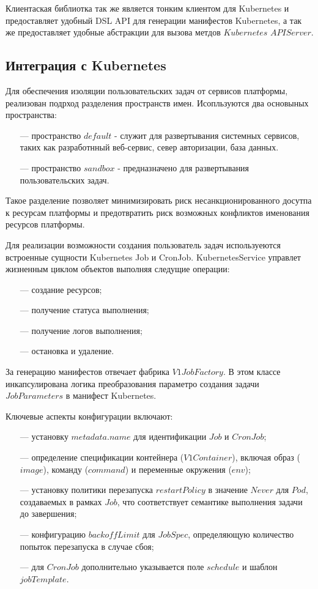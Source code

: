 Клиентаская библиотка так же является тонким клиентом для Kubernetes и предоставляет удобный DSL API для генерации манифестов Kubernetes\cite{poulton2023kubernetes}, а так же предоставляет удобные абстракции для вызова метдов $Kubernetes$ $API Server$.

\subsection{Интеграция с Kubernetes}

Для обеспечения изоляции пользовательских задач от сервисов платформы, реализован подрход разделения пространств имен.
Исопльзуются два основыных пространства:

\begin{itemize}
\item[---] пространство $default$ - служит для развертывания системных сервисов, таких как разработнный веб-сервис, север авторизации, база данных.
\item[---] пространство $sandbox$ - предназначено для развертывания пользовательских задач. 
\end{itemize}

Такое разделение позволяет минимизировать риск несанкционированного досутпа к ресурсам платформы и предотвратить риск возможных конфликтов именования ресурсов платформы.

Для реализации возможности создания пользователь задач используеются встроенные сущности Kubernetes Job и CronJob.
KubernetesService управлет жизненным циклом объектов выполняя следущие операции:

\begin{itemize}
\item[---]создание ресурсов;
\item[---]получение статуса выполнения;
\item[---]получение логов выполнения;
\item[---]остановка и удаление.
\end{itemize}

За генерацию манифестов отвечает фабрика\cite{cooper2000java} $V1JobFactory$. 
В этом классе инкапсулирована логика преобразования параметро создания задачи $JobParameters$ в манифест Kubernetes.

Ключевые аспекты конфигурации включают:

\begin{itemize}
\item[---]установку $metadata.name$ для идентификации $Job$ и $CronJob$;
\item[---]определение спецификации контейнера ($V1Container$), включая образ ($image$), команду ($command$) и переменные окружения ($env$);
\item[---]установку политики перезапуска $restartPolicy$ в значение $Never$ для $Pod$, создаваемых в рамках $Job$, что соответствует семантике выполнения задачи до завершения;
\item[---]конфигурацию $backoffLimit$ для $JobSpec$, определяющую количество попыток перезапуска в случае сбоя;
\item[---]для $CronJob$ дополнительно указывается поле $schedule$ и шаблон $jobTemplate$.
\end{itemize}

